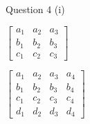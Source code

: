 \documentclass[a4paper,12pt]{article}
\begin{document}
\begin{enumerate}

Question 4
(i)

$ \begin{bmatrix}
a_1 & a_2 & a_3 \\
b_1 & b_2 & b_3 \\
c_1 & c_2 & c_3 
\end{bmatrix}  $


$ \begin{bmatrix}
a_1 & a_2 & a_3 & a_4 \\
b_1 & b_2 & b_3 & b_4 \\
c_1 & c_2 & c_3 & c_4 \\
d_1 & d_2 & d_3 & d_4 
\end{bmatrix}  $



\end{enumerate}
\end{document}
